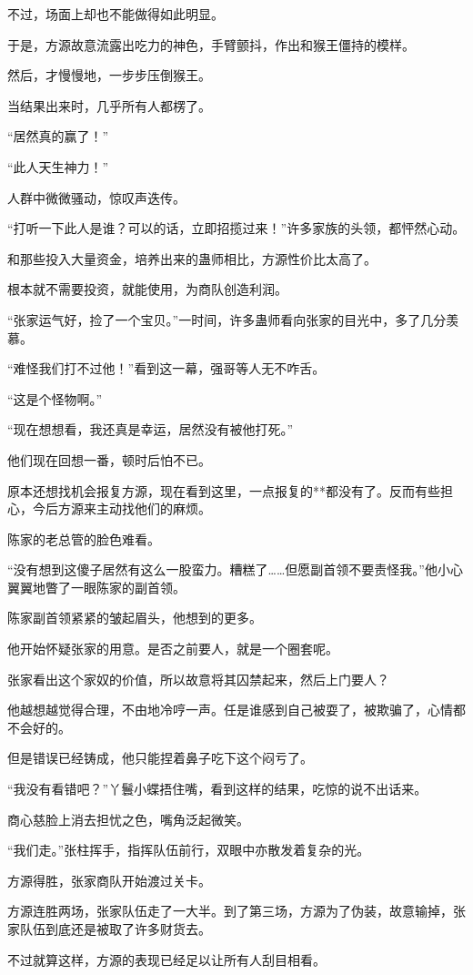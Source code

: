 \begin{this_body}
不过，场面上却也不能做得如此明显。

于是，方源故意流露出吃力的神色，手臂颤抖，作出和猴王僵持的模样。

然后，才慢慢地，一步步压倒猴王。

当结果出来时，几乎所有人都楞了。

“居然真的赢了！”

“此人天生神力！”

人群中微微骚动，惊叹声迭传。

“打听一下此人是谁？可以的话，立即招揽过来！”许多家族的头领，都怦然心动。

和那些投入大量资金，培养出来的蛊师相比，方源性价比太高了。

根本就不需要投资，就能使用，为商队创造利润。

“张家运气好，捡了一个宝贝。”一时间，许多蛊师看向张家的目光中，多了几分羡慕。

“难怪我们打不过他！”看到这一幕，强哥等人无不咋舌。

“这是个怪物啊。”

“现在想想看，我还真是幸运，居然没有被他打死。”

他们现在回想一番，顿时后怕不已。

原本还想找机会报复方源，现在看到这里，一点报复的**都没有了。反而有些担心，今后方源来主动找他们的麻烦。

陈家的老总管的脸色难看。

“没有想到这傻子居然有这么一股蛮力。糟糕了……但愿副首领不要责怪我。”他小心翼翼地瞥了一眼陈家的副首领。

陈家副首领紧紧的皱起眉头，他想到的更多。

他开始怀疑张家的用意。是否之前要人，就是一个圈套呢。

张家看出这个家奴的价值，所以故意将其囚禁起来，然后上门要人？

他越想越觉得合理，不由地冷哼一声。任是谁感到自己被耍了，被欺骗了，心情都不会好的。

但是错误已经铸成，他只能捏着鼻子吃下这个闷亏了。

“我没有看错吧？”丫鬟小蝶捂住嘴，看到这样的结果，吃惊的说不出话来。

商心慈脸上消去担忧之色，嘴角泛起微笑。

“我们走。”张柱挥手，指挥队伍前行，双眼中亦散发着复杂的光。

方源得胜，张家商队开始渡过关卡。

方源连胜两场，张家队伍走了一大半。到了第三场，方源为了伪装，故意输掉，张家队伍到底还是被取了许多财货去。

不过就算这样，方源的表现已经足以让所有人刮目相看。


\end{this_body}
